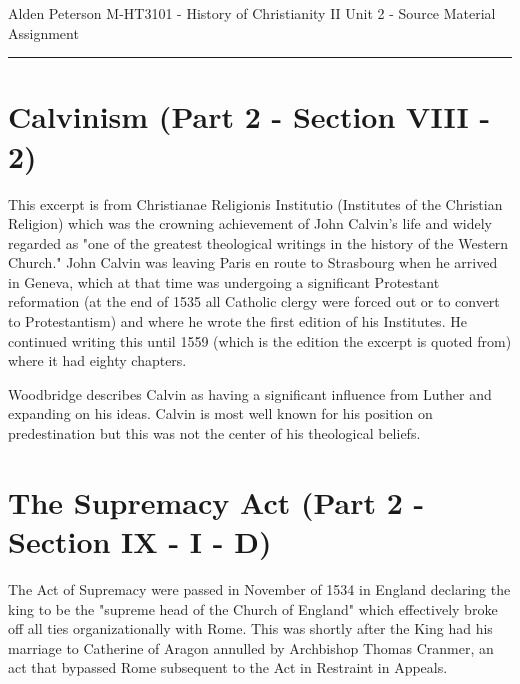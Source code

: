 \documentclass[12pt]{turabian-researchpaper}
\begin{document}
\begin{singlespace}
\noindent Alden Peterson \newline
\noindent M-HT3101 - History of Christianity II\newline
\noindent Unit 2 - Source Material Assignment
\newline\noindent\rule{4cm}{0.4pt}
\end{singlespace}








\section{Calvinism (Part 2 - Section VIII - 2)}
This excerpt is from Christianae Religionis Institutio (Institutes of the Christian Religion) which was the crowning achievement of John Calvin's life and widely regarded as "one of the greatest theological writings in the history of the Western Church."\autocite[pg.172]{woodbridge2013} John Calvin was leaving Paris en route to Strasbourg when he arrived in Geneva, which at that time was undergoing a significant Protestant reformation (at the end of 1535 all Catholic clergy were forced out or to convert to Protestantism) and where he wrote the first edition of his Institutes.\autocite[pg.158]{woodbridge2013} He continued writing this until 1559 (which is the edition the excerpt is quoted from) where it had eighty chapters.\autocite[pg.173]{woodbridge2013}

Woodbridge describes Calvin as having a significant influence from Luther and expanding on his ideas.\autocite[pg.173]{woodbridge2013} Calvin is most well known for his position on predestination but this was not the center of his theological beliefs.\autocite[pg.173]{woodbridge2013} 

\section{The Supremacy Act (Part 2 - Section IX - I - D)}

The Act of Supremacy were passed in November of 1534 in England declaring the king to be the "supreme head of the Church of England"\autocite[pg.242]{bettenson2011documents} which effectively broke off all ties organizationally with Rome.\autocite[pg.224]{woodbridge2013} This was shortly after the King had his marriage to Catherine of Aragon annulled by Archbishop Thomas Cranmer,
an act that bypassed Rome subsequent to the Act in Restraint in Appeals.\autocite[pg.224]{woodbridge2013}
\end{document}
